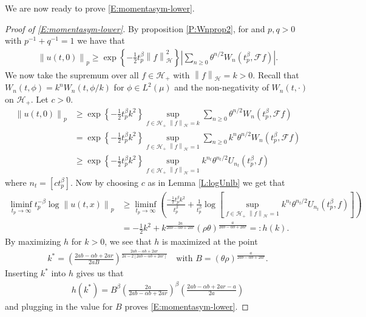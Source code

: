 \documentclass[a4paper,11pt]{article}
\numberwithin{equation}{section}
\numberwithin{equation}{section}
\theoremstyle{plain}
\theoremstyle{definition}
\newcommand{\Norm}[1]{\left\|  #1   \right\|}
\begin{document}
We are now ready to prove \eqref{E:momentasym-lower}.

\begin{proof}[Proof of \eqref{E:momentasym-lower}]
  By proposition \ref{P:Wnprop2}, for and $p,q >0$ with $p^{-1}+q^{-1} = 1$ we have that
  \begin{align*}
    \Norm{u(t,0)}_p \ge \exp\left\{ -\frac{1}{2} t_p^\beta \Norm{f}_{\mathcal{H}}^2 \right\}\left| \sum_{n \ge 0} \theta^{n/2} W_n(t_p^\beta, \mathcal{F}f) \right|.
  \end{align*}
  We now take the supremum over all $f \in \mathcal{H}_+$ with $\Norm{f}_{\mathcal{H}}=k >0 $.
  Recall that $W_n(t,\phi) = k^nW_n(t,\phi/k)$ for $\phi \in L^2(\mu)$ and the non-negativity of $W_n(t,\cdot)$ on $\mathcal{H}_+$. Let $c>0$.
  \begin{align*}
      \Norm{u(t,0)}_p
    & \ge   \exp\left\{ -\frac{1}{2} t_p^\beta k^2 \right\} \sup_{f\in \mathcal{H}_+ \; \Norm{f}_{\mathcal{H}}=k}\sum_{n \ge 0} \theta^{n/2} W_n(t_p^\beta, \mathcal{F}f) \\
    & = \exp\left\{ -\frac{1}{2} t_p^\beta k^2 \right\} \sup_{f\in \mathcal{H}_+ \; \Norm{f}_{\mathcal{H}}=1}\sum_{n \ge 0} k^n \theta^{n/2} W_n(t_p^\beta, \mathcal{F}f) \\
    & \ge \exp\left\{ -\frac{1}{2} t_p^\beta k^2 \right\} \sup_{f\in \mathcal{H}_+ \; \Norm{f}_{\mathcal{H}}=1} k^{n_t} \theta^{{n_t}/2} U_{n_t}(t_p^\beta, f)
  \end{align*}
  where $n_t = [ct_p^\beta]$. Now by choosing $c$ as in Lemma \ref{L:logUnlb} we get that
  \begin{align*}
    \liminf_{t_p \to \infty} t_p^{-\beta} \log \Norm{u(t,x)}_p
    & \ge   \liminf_{t_p \to \infty} \left( \frac{-\frac{1}{2}t_p^\beta k^2}{t_p^\beta} + \frac{1}{t_p^\beta}\log \left[ \sup_{f\in \mathcal{H}_+ \; \Norm{f}_{\mathcal{H}}=1} k^{n_t} \theta^{{n_t}/2} U_{n_t}(t_p^\beta, f) \right]  \right) \\
    & = -\frac{1}{2}k^2 + k^{ \frac{2a}{2ab-\alpha b +2ar} }(\rho \theta)^{\frac{a}{2ab -\alpha b + 2ar}} =: h(k).
  \end{align*}
  By maximizing $h$ for $k>0$, we see that $h$ is maximized at the point
  \begin{align*}
    k^* = \left( \frac{2ab -\alpha b + 2ar}{2aB} \right)^{ \frac{2ab-\alpha b +2ar}{2a-2[2ab-\alpha b + 2ar]}} \quad \text{with $B=(\theta\rho)^{ \frac{a}{2ab-\alpha b + 2ar} }$}.
  \end{align*}
  Inserting $k^*$ into $h$ gives us that
  \begin{align*}
    h(k^*) = B^{\beta}\left( \frac{2a}{2ab - \alpha b +2ar} \right)^\beta \left( \frac{2ab-\alpha b + 2ar -a }{2a} \right)
  \end{align*}
  and plugging in the value for $B$ proves \eqref{E:momentasym-lower}.
\end{proof}
\end{document}
